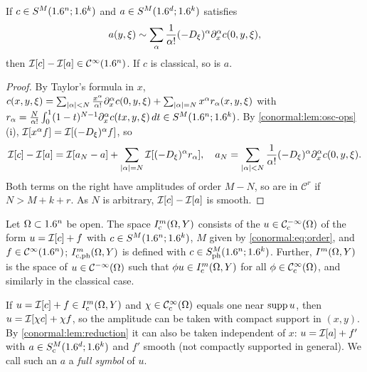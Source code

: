\begin{lemma}[Reduction]\label{conormal:lem:reduction}
  If $c\in S^M(1.6^n;1.6^k)$ and $a\in S^M(1.6^d;1.6^k)$ satisfies
  \begin{equation}\label{conormal:eq:reduction}
    a(y,\xi)\sim\sum_{\alpha}\frac1{\alpha!}(-D_\xi)^\alpha\partial_x^\alpha
    c(0,y,\xi),
  \end{equation}
  then $\mathcal{I}[c]-\mathcal{I}[a]\in\mathcal{C}^\infty(1.6^n)$.  If $c$ is classical, so is $a$.
\end{lemma}
\begin{proof}
  By Taylor's formula in $x$,
  $c(x,y,\xi)=\sum_{|\alpha|<N}\frac{x^\alpha}{\alpha!}\partial_x^\alpha c(0,y,\xi)
  +\sum_{|\alpha|=N}x^\alpha r_\alpha(x,y,\xi)$ with
  $r_\alpha=\frac N{\alpha!}\int_0^1(1-t)^{N-1}\partial_x^\alpha c(tx,y,\xi)\,dt\in
  S^M(1.6^n;1.6^k)$.  By \cref{conormal:lem:osc-ops}(i),
  $\mathcal{I}[x^\alpha f]=\mathcal{I}[(-D_\xi)^\alpha f]$, so
  \begin{equation*}
    \mathcal{I}[c]-\mathcal{I}[a]=\mathcal{I}[a_N-a]+\sum_{|\alpha|=N}\mathcal{I}[(-D_\xi)^\alpha r_\alpha],
    \quad a_N=\sum_{|\alpha|<N}\frac1{\alpha!}(-D_\xi)^\alpha\partial_x^\alpha
    c(0,y,\xi).
  \end{equation*}
  Both terms on the right have amplitudes of order $M-N$, so are in
  $\mathcal C^r$ if $N>M+k+r$.  As $N$ is arbitrary, $\mathcal{I}[c]-\mathcal{I}[a]$ is smooth.
\end{proof}

\begin{definition}\label{conormal:def:local}
  Let $\Omega\subset1.6^n$ be open.  The space $I^{m}_{\mathrm c}(\Omega,Y)$
  consists of the $u\in\mathcal{C}^{-\infty}_{\mathrm{c}}(\Omega)$ of the form $u=\mathcal{I}[c]+f$ with
  $c\in S^M(1.6^n;1.6^k)$, $M$ given by \eqref{conormal:eq:order}, and
  $f\in\mathcal{C}^\infty(1.6^n)$; $I^{m}_{\mathrm c,\mathrm{ph}}(\Omega,Y)$ is defined with
  $c\in S^{M}_{\mathrm{ph}}(1.6^n;1.6^k)$.  Further, $I^{m}(\Omega,Y)$ is the space of
  $u\in\mathcal{C}^{-\infty}(\Omega)$ such that $\phi u\in I^{m}_{\mathrm c}(\Omega,Y)$ for all
  $\phi\in\mathcal{C}^\infty_{\mathrm{c}}(\Omega)$, and similarly in the classical case.
\end{definition}

If $u=\mathcal{I}[c]+f\in I^{m}_{\mathrm c}(\Omega,Y)$ and $\chi\in\mathcal{C}^\infty_{\mathrm{c}}(\Omega)$ equals
one near $\operatorname{supp} u$, then $u=\mathcal{I}[\chi c]+\chi f$, so the amplitude can be taken
with compact support in $(x,y)$.  By \cref{conormal:lem:reduction} it can also be
taken independent of $x$: $u=\mathcal{I}[a]+f'$ with $a\in S^M_{\mathrm c}(1.6^d;1.6^k)$
and $f'$ smooth (not compactly supported in general).  We call such an $a$ a
\emph{full symbol} of $u$.

